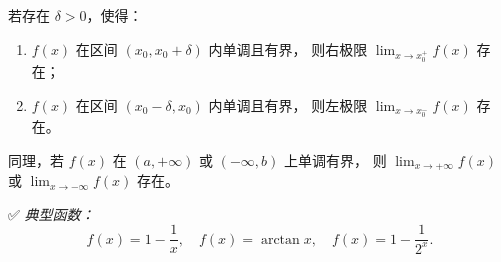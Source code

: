 \begin{enumerate}
          若存在 $\delta > 0$，使得：

          \begin{enumerate}
              \item $f(x)$ 在区间 $(x_0, x_0 + \delta)$ 内单调且有界，
                    则右极限 $\displaystyle \lim_{x \to x_0^+} f(x)$ 存在；
              \item $f(x)$ 在区间 $(x_0 - \delta, x_0)$ 内单调且有界，
                    则左极限 $\displaystyle \lim_{x \to x_0^-} f(x)$ 存在。
          \end{enumerate}

          同理，若 $f(x)$ 在 $(a, +\infty)$ 或 $(-\infty, b)$ 上单调有界，
          则 $\displaystyle \lim_{x \to +\infty} f(x)$ 或 $\lim_{x \to -\infty} f(x)$ 存在。

          ✅ \textit{典型函数：}
          \[
              f(x) = 1 - \frac{1}{x},\quad f(x)=\arctan x,\quad f(x)=1 - \frac{1}{2^x}.
          \]
\end{enumerate}